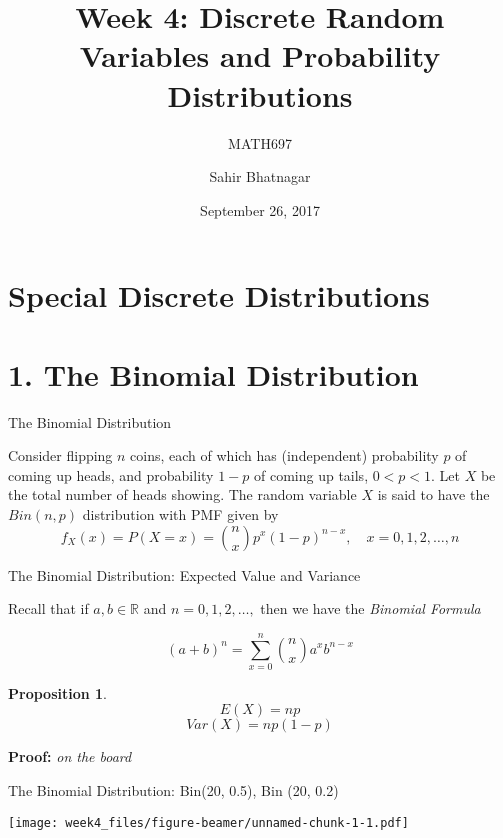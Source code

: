 \documentclass[12pt,ignorenonframetext,compress]{beamer}
\institute{McGill University}
\title{Week 4: Discrete Random Variables and Probability Distributions}
\subtitle{MATH697}
\author{Sahir Bhatnagar}
\date{September 26, 2017}
\newtheorem{proposition}[theorem]{Proposition}
\begin{document}
\frame{\titlepage}

\section{Special Discrete
Distributions}\label{special-discrete-distributions}

\section{1. The Binomial Distribution}\label{the-binomial-distribution}

\begin{frame}{The Binomial Distribution}

Consider flipping \(n\) coins, each of which has (independent)
probability \(p\) of coming up heads, and probability \(1-p\) of coming
up tails, \(0 < p < 1\). Let \(X\) be the total number of heads showing.
The random variable \(X\) is said to have the \(Bin(n, p)\) distribution
with PMF given by
\[ f_X(x) = P(X=x) = \binom{n}{x}p^x (1-p)^{n-x}, \quad   x = 0,1,2,\ldots, n \]

\end{frame}

\begin{frame}{The Binomial Distribution: Expected Value and Variance}

Recall that if \(a,b \in \mathbb{R}\) and \(n = 0,1,2,\ldots,\) then we
have the \emph{Binomial Formula}

\[(a+b)^n = \sum_{x=0}^{n} \binom{n}{x}a^x b^{n-x} \]

\pause 

\begin{proposition}
\[E(X) = np\]
\[Var(X) = np(1-p)\]
\end{proposition}

\textbf{Proof:} \emph{on the board}

\end{frame}

\begin{frame}{The Binomial Distribution: Bin(20, 0.5), Bin (20, 0.2)}

\texttt{[image: week4\_files/figure-beamer/unnamed-chunk-1-1.pdf]}

\end{frame}
\end{document}
